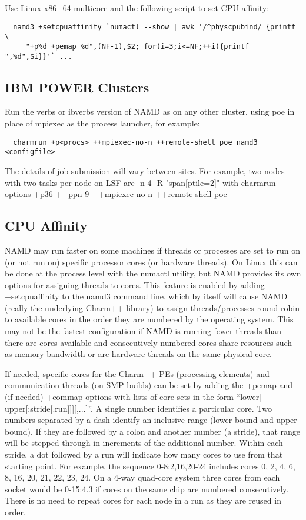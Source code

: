 Use Linux-x86\_64-multicore and the following script to set CPU affinity:

\begin{verbatim}
  namd3 +setcpuaffinity `numactl --show | awk '/^physcpubind/ {printf \
     "+p%d +pemap %d",(NF-1),$2; for(i=3;i<=NF;++i){printf ",%d",$i}}'` ...
\end{verbatim}

\subsection{IBM POWER Clusters}

Run the verbs or ibverbs version of NAMD as on any other cluster,
using poe in place of mpiexec as the process launcher, for example:
  
\begin{verbatim}
  charmrun +p<procs> ++mpiexec-no-n ++remote-shell poe namd3 <configfile>
\end{verbatim}
  
The details of job submission will vary between sites.  For example,
two nodes with two tasks per node on LSF are -n 4 -R "span[ptile=2]"
with charmrun options +p36 ++ppn 9 ++mpiexec-no-n ++remote-shell poe

\subsection{CPU Affinity}

NAMD may run faster on some machines if threads or processes are set to
run on (or not run on) specific processor cores (or hardware threads).
On Linux this can be done at the process level with the numactl utility,
but NAMD provides its own options for assigning threads to cores.  This
feature is enabled by adding +setcpuaffinity to the namd3 command line,
which by itself will cause NAMD (really the underlying Charm++ library)
to assign threads/processes round-robin to available cores in the order
they are numbered by the operating system.  This may not be the fastest
configuration if NAMD is running fewer threads than there are cores
available and consecutively numbered cores share resources such as
memory bandwidth or are hardware threads on the same physical core.

If needed, specific cores for the Charm++ PEs (processing elements) and
communication threads (on SMP builds) can be set by adding the +pemap
and (if needed) +commap options with lists of core sets in the form
``lower[-upper[:stride[.run]]][,...]''.  A single number identifies a
particular core.  Two numbers separated by a dash identify an inclusive
range (lower bound and upper bound).  If they are followed by a colon and
another number (a stride), that range will be stepped through in increments
of the additional number.  Within each stride, a dot followed by a run will
indicate how many cores to use from that starting point.  For example, the
sequence 0-8:2,16,20-24 includes cores 0, 2, 4, 6, 8, 16, 20, 21, 22, 23, 24.
On a 4-way quad-core system three cores from each socket would be 0-15:4.3
if cores on the same chip are numbered consecutively.  There is no need
to repeat cores for each node in a run as they are reused in order.

